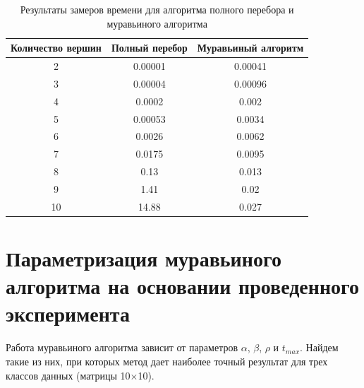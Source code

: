 \documentclass[a4paper,oneside,14pt]{extreport}
\begin{document}
\begin{table}[H]
	\caption{Результаты замеров времени для алгоритма полного перебора и муравьиного алгоритма}
	\begin{center}
		\label{tab2}
		\begin{tabular}{|c|c|c|}
			\hline
			Количество вершин &Полный перебор& Муравьиный алгоритм \\\hline
			2&0.00001&0.00041\\
			3&0.00004&0.00096\\
			4&0.0002&0.002\\
			5&0.00053&0.0034\\
			6&0.0026&0.0062\\
			7&0.0175&0.0095\\
			8&0.13&0.013\\
			9&1.41&0.02\\
			10&14.88&0.027\\
			\hline
		\end{tabular}
	\end{center}
\end{table} 

\begin{center}
\end{center}

\section{Параметризация муравьиного алгоритма на основании проведенного эксперимента}	

Работа муравьиного алгоритма зависит от параметров $\alpha$, $\beta$, $\rho$ и $t_{max}$. Найдем такие из них, при которых метод дает наиболее точный результат для трех классов данных (матрицы 10$\times$10).
\end{document}
